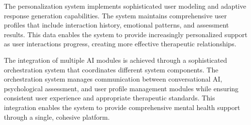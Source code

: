 The personalization system implements sophisticated user modeling and adaptive response generation capabilities. The system maintains comprehensive user profiles that include interaction history, emotional patterns, and assessment results. This data enables the system to provide increasingly personalized support as user interactions progress, creating more effective therapeutic relationships.

The integration of multiple AI modules is achieved through a sophisticated orchestration system that coordinates different system components. The orchestration system manages communication between conversational AI, psychological assessment, and user profile management modules while ensuring consistent user experience and appropriate therapeutic standards. This integration enables the system to provide comprehensive mental health support through a single, cohesive platform. 